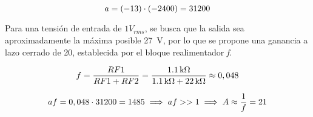 \begin{equation}
	\centering
	a = (-13) \cdot (-2400) = 31200
	\label{ec.a}
\end{equation}

Para una tensión de entrada de $1V_{rms}$, se busca que la salida sea aproximadamente la máxima posible \SI{27}{\volt}, por lo que se propone una ganancia a lazo cerrado de 20, establecida por el bloque realimentador \textit{f}.

\begin{equation}
	\centering
	f = \frac{RF1}{RF1 + RF2} = \frac{\SI{1.1}{\kilo\ohm}}{\SI{1.1}{\kilo\ohm} + \SI{22}{\kilo\ohm}} \approx 0,048
\end{equation}

\begin{equation}
	\centering
	af = 0,048 \cdot 31200 = 1485 \implies af >> 1 \implies A \approx \frac{1}{f} = 21
\end{equation}

	
	






